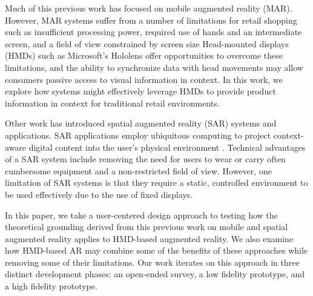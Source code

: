 
Much of this previous work has focused on mobile augmented reality (MAR). However, MAR systems suffer from a number of limitations for retail shopping such as insufficient processing power, required use of hands and an intermediate screen, and a field of view constrained by screen size \cite{bimber2005spatial}   Head-mounted displays (HMDs) such as Microsoft's Hololens offer opportunities to overcome these limitations, and the ability to synchronize data with head movements may allow consumers passive access to visual information in context. In this work, we explore how systems might effectively leverage HMDs to provide product information in context for traditional retail environments. 

Other work has introduced spatial augmented reality (SAR) systems and applications.  SAR applications employ ubiquitous computing to project context-aware digital content into the user's physical environment \cite{benko2015fovear,benko2014dyadic}.  Technical advantages of a SAR system include removing the need for users to wear or carry often cumbersome equipment and a non-restricted field of view.   %
However, one limitation of SAR systems is that they require a static, controlled environment to be used effectively due to the use of fixed displays. 

In this paper, we take a user-centered design approach to testing how the theoretical grounding derived from this previous work on mobile and spatial augmented reality applies to HMD-based augmented reality.  We also examine how HMD-based AR may combine some of the benefits of these approaches while removing some of their limitations. Our work iterates on this approach in three distinct development phases: an open-ended survey, a low fidelity prototype, and a high fidelity prototype. 